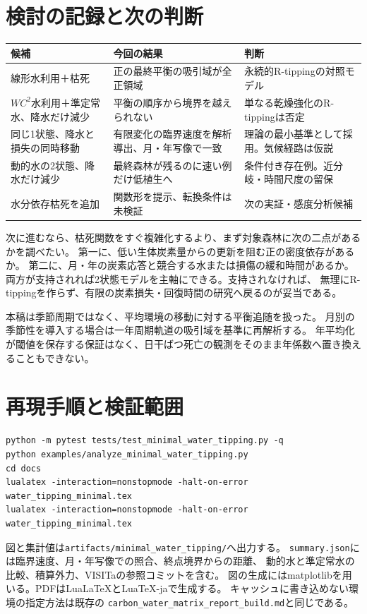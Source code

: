 \documentclass[a4paper,11pt]{ltjsarticle}
\newcommand{\code}[1]{\nolinkurl{#1}}
\begin{document}
\section{検討の記録と次の判断}
\begin{longtable}{p{.25\linewidth}p{.36\linewidth}p{.32\linewidth}}
\toprule 候補 & 今回の結果 & 判断\\\midrule\endhead
線形水利用＋枯死 & 正の最終平衡の吸引域が全正領域 & 永続的R-tippingの対照モデル\\
$WC^2$水利用＋準定常水、降水だけ減少 & 平衡の順序から境界を越えられない & 単なる乾燥強化のR-tippingは否定\\
同じ1状態、降水と損失の同時移動 & 有限変化の臨界速度を解析導出、月・年写像で一致 & 理論の最小基準として採用。気候経路は仮説\\
動的水の2状態、降水だけ減少 & 最終森林が残るのに速い例だけ低植生へ & 条件付き存在例。近分岐・時間尺度の留保\\
水分依存枯死を追加 & 関数形を提示、転換条件は未検証 & 次の実証・感度分析候補\\
\bottomrule
\end{longtable}
次に進むなら、枯死関数をすぐ複雑化するより、まず対象森林に次の二点があるかを調べたい。
第一に、低い生体炭素量からの更新を阻む正の密度依存があるか。
第二に、月・年の炭素応答と競合する水または損傷の緩和時間があるか。
両方が支持されれば2状態モデルを主軸にできる。支持されなければ、
無理にR-tippingを作らず、有限の炭素損失・回復時間の研究へ戻るのが妥当である。

本稿は季節周期ではなく、平均環境の移動に対する平衡追随を扱った。
月別の季節性を導入する場合は一年周期軌道の吸引域を基準に再解析する。
年平均化が閾値を保存する保証はなく、日干ばつ死亡の観測をそのまま年係数へ置き換えることもできない。

\appendix
\section{再現手順と検証範囲}
\begin{verbatim}
python -m pytest tests/test_minimal_water_tipping.py -q
python examples/analyze_minimal_water_tipping.py
cd docs
lualatex -interaction=nonstopmode -halt-on-error water_tipping_minimal.tex
lualatex -interaction=nonstopmode -halt-on-error water_tipping_minimal.tex
\end{verbatim}
図と集計値は\code{artifacts/minimal_water_tipping/}へ出力する。
\code{summary.json}には臨界速度、月・年写像での照合、終点境界からの距離、
動的水と準定常水の比較、積算外力、VISITaの参照コミットを含む。
図の生成にはmatplotlibを用いる。PDFはLuaLaTeXとLuaTeX-jaで生成する。
キャッシュに書き込めない環境の指定方法は既存の
\code{carbon_water_matrix_report_build.md}と同じである。
\end{document}
